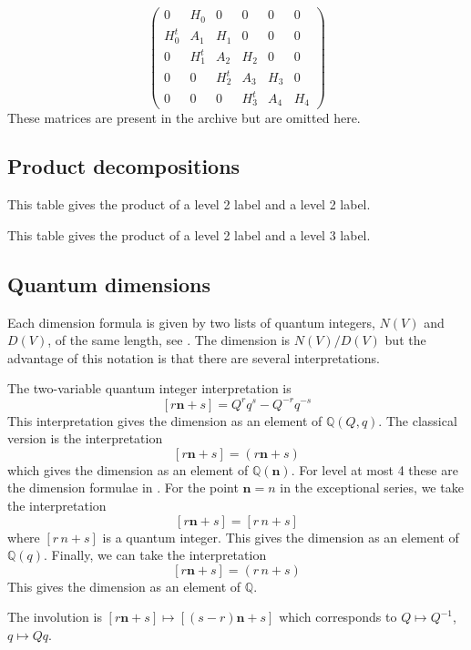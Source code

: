 \documentclass[12pt]{amsart}
\providecommand{\nv}{\mathbf{n}}
\newcommand\bQ{\mathbb{Q}}
\begin{document}
\begin{equation*}
\begin{pmatrix}
0 & H_0 & 0 & 0 & 0 & 0 \\
H_0^t & A_1 & H_1 & 0 & 0 & 0 \\
0 & H_1^t & A_2 & H_2 & 0 & 0 \\
0 & 0 & H_2^t & A_3 & H_3 & 0 \\
0 & 0 & 0 & H_3^t & A_4 & H_4
\end{pmatrix}
\end{equation*}
These matrices are present in the archive but are omitted here.










\subsection{Product decompositions}
This table gives the product of a level 2 label and a level 2 label.

This table gives the product of a level 2 label and a level 3 label.


\subsection{Quantum dimensions}
Each dimension formula is given by two lists of quantum integers, $N(V)$ and $D(V)$,
of the same length, see \cite[\S1.2]{morrison2024}. The dimension is $N(V)/D(V)$ but the advantage of this notation is that there are several interpretations.

The two-variable quantum integer interpretation is 
\[ [r\nv+s] = Q^rq^s - Q^{-r}q^{-s} \]
This interpretation gives the dimension as an element of $\bQ(Q,q)$.
The classical version is the interpretation
\[ [r\nv+s] = (r\nv+s) \]
which gives the dimension as an element of $\bQ(\nv)$. For level at most 4 these are
the dimension formulae in \cite{cohen1996}.
For the point $\nv = n$ in the exceptional series,  we take the interpretation
\[ [r\nv+s] = [r\,n+s] \] where $[r\,n+s]$ is a quantum integer. This gives the dimension
as an element of $\bQ(q)$. Finally, we can take the interpretation
\[ [r\nv+s] = (r\,n+s) \]  
This gives the dimension as an element of $\bQ$.

The involution is $[r\nv+s] \mapsto [(s-r)\nv+s]$ which corresponds to $Q\mapsto Q^{-1}$, $q\mapsto Qq$.
\end{document}
